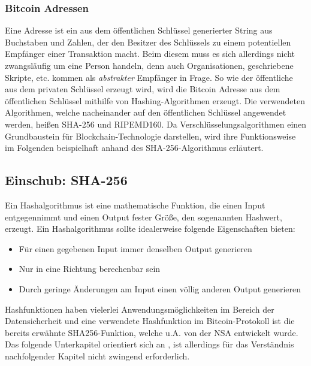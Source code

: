 \subsubsection{Bitcoin Adressen}
Eine Adresse ist ein aus dem öffentlichen Schlüssel generierter String aus Buchstaben und Zahlen, der den Besitzer des Schlüssels zu einem potentiellen Empfänger einer Transaktion macht. Beim diesem muss es sich allerdings nicht zwangsläufig um eine Person handeln, denn auch Organisationen, geschriebene Skripte, etc. kommen als \emph{abstrakter} Empfänger in Frage.
So wie der öffentliche aus dem privaten Schlüssel erzeugt wird, wird die Bitcoin Adresse aus dem öffentlichen Schlüssel mithilfe von Hashing-Algorithmen erzeugt. 
Die verwendeten Algorithmen, welche nacheinander auf den öffentlichen Schlüssel angewendet werden, heißen SHA-256 und RIPEMD160.
Da Verschlüsselungsalgorithmen einen Grundbaustein für Blockchain-Technologie darstellen, wird ihre Funktionsweise im Folgenden beispielhaft anhand des SHA-256-Algorithmus erläutert. 

\subsection{Einschub: SHA-256}
Ein Hashalgorithmus ist eine mathematische Funktion, die einen Input entgegennimmt und einen Output fester Größe, den sogenannten Hashwert, erzeugt. Ein Hashalgorithmus sollte idealerweise folgende Eigenschaften bieten:
\begin{itemize}
	\item Für einen gegebenen Input immer denselben Output generieren
	\item Nur in eine Richtung berechenbar sein
	\item Durch geringe Änderungen am Input einen völlig anderen Output generieren
\end{itemize}

Hashfunktionen haben vielerlei Anwendungsmöglichkeiten im Bereich der Datensicherheit und eine verwendete Hashfunktion im Bitcoin-Protokoll ist die bereits erwähnte SHA256-Funktion, welche u.A. von der NSA entwickelt wurde. Das folgende Unterkapitel orientiert sich an \cite{dang_2015}, ist allerdings für das Verständnis nachfolgender Kapitel nicht zwingend erforderlich.
